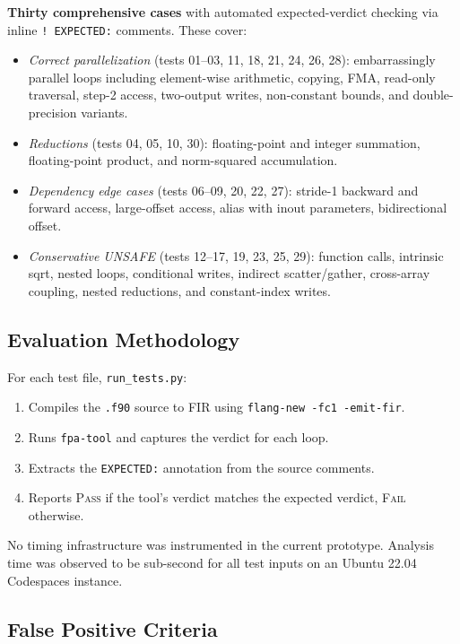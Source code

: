 \documentclass[conference]{IEEEtran}
\begin{document}
\textbf{Thirty comprehensive cases} with automated expected-verdict
checking via inline \texttt{! EXPECTED:} comments.  These cover:
\begin{itemize}
  \item \emph{Correct parallelization} (tests 01--03, 11, 18, 21,
        24, 26, 28): embarrassingly parallel loops including
        element-wise arithmetic, copying, FMA, read-only traversal,
        step-2 access, two-output writes, non-constant bounds, and
        double-precision variants.
  \item \emph{Reductions} (tests 04, 05, 10, 30): floating-point and
        integer summation, floating-point product, and norm-squared
        accumulation.
  \item \emph{Dependency edge cases} (tests 06--09, 20, 22, 27):
        stride-1 backward and forward access, large-offset access,
        alias with inout parameters, bidirectional offset.
  \item \emph{Conservative UNSAFE} (tests 12--17, 19, 23, 25, 29):
        function calls, intrinsic sqrt, nested loops, conditional
        writes, indirect scatter/gather, cross-array coupling,
        nested reductions, and constant-index writes.
\end{itemize}

\subsection{Evaluation Methodology}

For each test file, \texttt{run\_tests.py}:
\begin{enumerate}
  \item Compiles the \texttt{.f90} source to FIR using
        \texttt{flang-new -fc1 -emit-fir}.
  \item Runs \texttt{fpa-tool} and captures the verdict for each loop.
  \item Extracts the \texttt{EXPECTED:} annotation from the source
        comments.
  \item Reports \textsc{Pass} if the tool's verdict matches the
        expected verdict, \textsc{Fail} otherwise.
\end{enumerate}

No timing infrastructure was instrumented in the current prototype.
Analysis time was observed to be sub-second for all test inputs on an
Ubuntu 22.04 Codespaces instance.

\subsection{False Positive Criteria}
\end{document}
